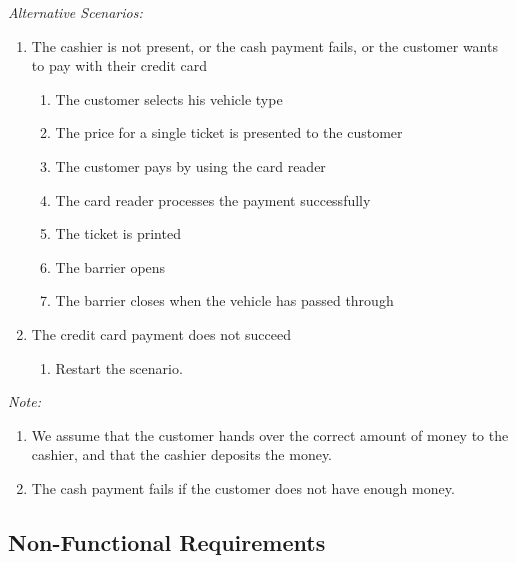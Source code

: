 \textit{Alternative Scenarios: }
\begin{enumerate}
	\item The cashier is not present, or the cash payment fails, or the customer wants to pay with their credit card
		\begin{enumerate}
			\item The customer selects his vehicle type
			\item The price for a single ticket is presented to the customer
			\item The customer pays by using the card reader
			\item The card reader processes the payment successfully
			\item The ticket is printed
			\item The barrier opens
			\item The barrier closes when the vehicle has passed through
		\end{enumerate}
		
	\item The credit card payment does not succeed 
		\begin{enumerate}
			\item Restart the scenario.
		\end{enumerate}

 \end{enumerate} 
 
 \textit{Note:} 
 \begin{enumerate}
 \item We assume that the customer hands over the correct amount of money to the cashier, and that the cashier deposits the money.
 \item The cash payment fails if the customer does not have enough money.
 \end{enumerate}


\subsection{Non-Functional Requirements}